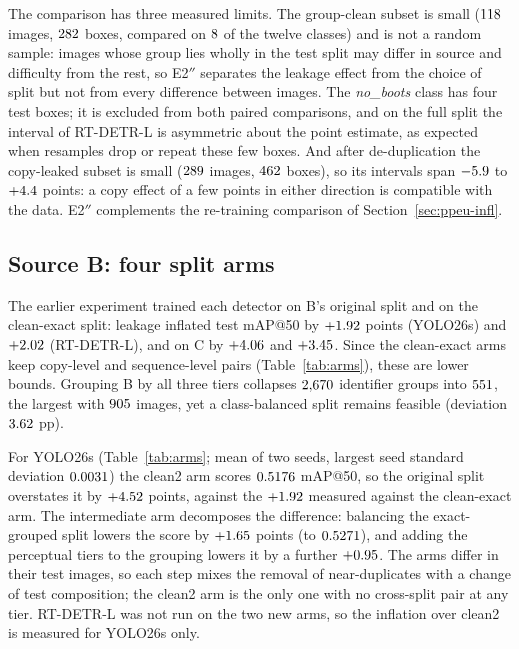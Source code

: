\documentclass[review,12pt]{elsarticle}
\begin{document}
The comparison has three measured limits. The group-clean subset is
small ($118$ images, $282$ boxes, compared on
$8$ of the twelve classes) and is not a random sample:
images whose group lies wholly in the test split may differ in source
and difficulty from the rest, so E2$''$ separates the leakage effect
from the choice of split but not from every difference between images.
The \emph{no\_boots} class has four test boxes; it is excluded from both
paired comparisons, and on the full split the interval of RT-DETR-L
is asymmetric about the point estimate, as expected when resamples drop
or repeat these few boxes. And after
de-duplication the copy-leaked subset is small ($289$ images,
$462$ boxes), so its intervals span $-5.9$ to
$+4.4$ points: a copy effect of a few points in either
direction is compatible with the data. E2$''$ complements the
re-training comparison of Section~\ref{sec:ppeu-infl}.



\subsection{Source B: four split arms}
\label{sec:arms-res}
The earlier experiment trained each detector on B's original split and
on the clean-exact split: leakage inflated test mAP@50 by
$+1.92$ points (YOLO26s) and $+2.02$ (RT-DETR-L),
and on C by $+4.06$ and $+3.45$. Since the
clean-exact arms keep copy-level and sequence-level pairs
(Table~\ref{tab:arms}), these are lower bounds. Grouping B by all
three tiers collapses $2{,}670$ identifier groups into
$551$, the largest with $905$ images, yet a
class-balanced split remains feasible (deviation $3.62$ pp).

For YOLO26s (Table~\ref{tab:arms}; mean of two seeds, largest seed
standard deviation $0.0031$) the clean2 arm scores
$0.5176$ mAP@50, so the original split overstates it by
$+4.52$ points, against the $+1.92$ measured
against the clean-exact arm. The intermediate arm decomposes the
difference: balancing the exact-grouped split lowers the score by
$+1.65$ points (to $0.5271$), and adding the
perceptual tiers to the grouping lowers it by a further
$+0.95$. The arms differ in their test images, so each
step mixes the removal of near-duplicates with a change of test
composition; the clean2 arm is the only one with no cross-split pair
at any tier. RT-DETR-L was not run on the two new arms, so the
inflation over clean2 is measured for YOLO26s only.
\end{document}
